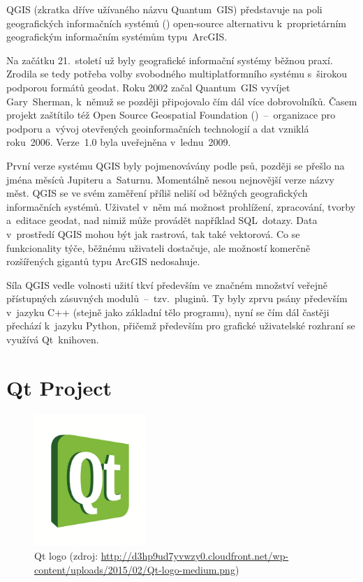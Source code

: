 QGIS (zkratka dříve užívaného názvu Quantum~GIS) představuje na poli
geogra\-fic\-kých informačních systémů () open-source
alternativu k~proprietárním geografic\-kým informačním systémům
typu~ArcGIS.

Na začátku 21.~století už byly geografické informační systémy běžnou
praxí. Zrodila se tedy potřeba volby svobodného multiplatformního
systému s~širokou podporou formátů geodat. Roku 2002 začal Quantum~GIS
vyvíjet Gary~Sherman, k~němuž se později připojovalo čím dál více
dobrovolníků. Časem projekt zaštítilo též Open Source Geospatial
Foundation ()~–~organizace pro podporu a~vývoj otevřených
geoinformačních technologií a dat vzniklá roku~2006. Verze~1.0 byla
uveřejněna v~lednu~2009.

První verze systému QGIS byly pojmenovávány podle psů, později se
přešlo na jména měsíců Jupiteru a~Saturnu. Momentálně nesou nejnovější
verze názvy měst.  QGIS se ve svém zaměření příliš neliší od běžných
geografických informačních systémů. Uživatel v~něm má možnost
prohlížení, zpracování, tvorby a~editace geodat, nad nimiž může
provádět například SQL~dotazy. Data v~prostředí QGIS mohou být jak
rastrová, tak také vektorová. Co se funkcionality týče, běžnému
uživateli dostačuje, ale možností komerčně rozšířených gigantů typu ArcGIS
nedosahuje.

Síla QGIS vedle volnosti užití tkví především ve značném množství
veřejně přístupných zásuvných modulů~–~tzv.~pluginů. Ty byly zprvu
psány především v~jazyku C++ (stejně jako základní tělo programu),
nyní se čím dál častěji přechází k~jazyku Python, přičemž především
pro grafické uživatelské rozhraní se využívá Qt~knihoven.



\section{Qt Project}
\label{qt}

  \begin{figure}[H]
    \centering
      \includegraphics[width=120pt]{./pictures/qt.png}
      \caption[Qt logo]{Qt logo 
      (zdroj: \url{http://d3hp9ud7yvwzy0.cloudfront.net/wp-content/uploads/2015/02/Qt-logo-medium.png})}
      \label{fig:qt}
  \end{figure}

